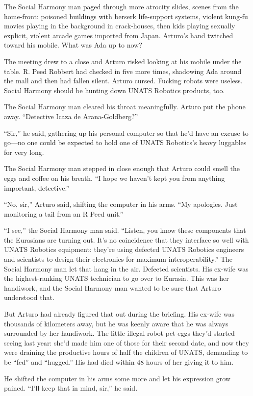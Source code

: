 The Social Harmony man paged through more atrocity slides, scenes
from the home-front: poisoned buildings with berserk life-support
systems, violent kung-fu movies playing in the background in
crack-houses, then kids playing sexually explicit, violent arcade
games imported from Japan. Arturo’s hand twitched toward his
mobile. What was Ada up to now?

The meeting drew to a close and Arturo risked looking at his mobile
under the table. R. Peed Robbert had checked in five more times,
shadowing Ada around the mall and then had fallen silent. Arturo
cursed. Fucking robots were useless. Social Harmony should be
hunting down UNATS Robotics products, too.

The Social Harmony man cleared his throat meaningfully. Arturo put
the phone away. “Detective Icaza de Arana-Goldberg?”

“Sir,” he said, gathering up his personal computer so that he’d
have an excuse to go—no one could be expected to hold one of UNATS
Robotics’s heavy luggables for very long.

The Social Harmony man stepped in close enough that Arturo could
smell the eggs and coffee on his breath. “I hope we haven’t kept
you from anything important, detective.”

“No, sir,” Arturo said, shifting the computer in his arms. “My
apologies. Just monitoring a tail from an R Peed unit.”

“I see,” the Social Harmony man said. “Listen, you know these
components that the Eurasians are turning out. It’s no coincidence
that they interface so well with UNATS Robotics equipment: they’re
using defected UNATS Robotics engineers and scientists to design
their electronics for maximum interoperability.” The Social Harmony
man let that hang in the air. Defected scientists. His ex-wife was
the highest-ranking UNATS technician to go over to Eurasia. This
was her handiwork, and the Social Harmony man wanted to be sure
that Arturo understood that.

But Arturo had already figured that out during the briefing. His
ex-wife was thousands of kilometers away, but he was keenly aware
that he was always surrounded by her handiwork. The little illegal
robot-pet eggs they’d started seeing last year: she’d made him one
of those for their second date, and now they were draining the
productive hours of half the children of UNATS, demanding to be
“fed” and “hugged.” His had died within 48 hours of her giving it
to him.

He shifted the computer in his arms some more and let his
expression grow pained. “I’ll keep that in mind, sir,” he said.

